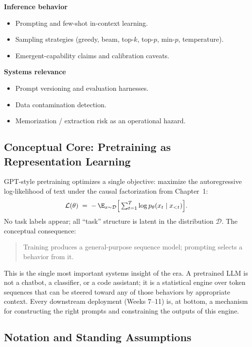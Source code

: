 \textbf{Inference behavior}
\begin{itemize}
  \item Prompting and few-shot in-context learning.
  \item Sampling strategies (greedy, beam, top-$k$, top-$p$, min-$p$,
        temperature).
  \item Emergent-capability claims and calibration caveats.
\end{itemize}

\textbf{Systems relevance}
\begin{itemize}
  \item Prompt versioning and evaluation harnesses.
  \item Data contamination detection.
  \item Memorization / extraction risk as an operational hazard.
\end{itemize}

\subsection{Conceptual Core: Pretraining as Representation Learning}

GPT-style pretraining optimizes a single objective: maximize the
autoregressive log-likelihood of text under the causal factorization
from Chapter~1:
\begin{equation}
\label{eq:week5-pretrain-obj}
\mathcal{L}(\theta)
 \;=\; -\,\E_{x \sim \mathcal{D}}
       \Bigl[\,\textstyle\sum_{t=1}^{T} \log p_\theta(x_t \mid x_{<t})\Bigr].
\end{equation}
No task labels appear; all ``task'' structure is latent in the
distribution $\mathcal{D}$. The conceptual consequence:
\begin{quote}
Training produces a general-purpose sequence model;
prompting selects a behavior from it.
\end{quote}
This is the single most important systems insight of the era. A
pretrained LLM is not a chatbot, a classifier, or a code assistant;
it is a statistical engine over token sequences that can be steered
toward any of those behaviors by appropriate context. Every
downstream deployment (Weeks 7--11) is, at bottom, a mechanism for
constructing the right prompts and constraining the outputs of this
engine.

\subsection{Notation and Standing Assumptions}
\label{sec:week5-notation}


